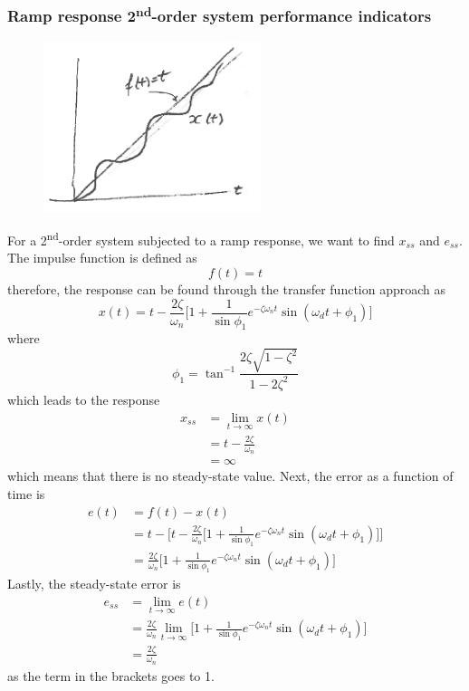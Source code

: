 \documentclass[12pt,letter]{article}
\numberwithin{ex}{section} %
\numberwithin{re}{section} %
\numberwithin{equation}{section}	%
\begin{document}
\subsubsection{Ramp response 2\textsuperscript{nd}-order system performance indicators}

\begin{figure}[H]
	\centering
	\includegraphics[width=2.5in]{../figures/ramp_response_2nd_order_with_steady_state_error}
\end{figure}

For a 2\textsuperscript{nd}-order system subjected to a ramp response, we want to find $x_{ss}$ and $e_{ss}$. The impulse function is defined as
\begin{equation}
f(t) = t
\end{equation}
therefore, the response can be found through the transfer function approach as
\begin{equation}
x(t) = t - \frac{2 \zeta}{\omega_n} \bigg[ 1 + \frac{1}{\sin \phi_1} e^{-\zeta \omega_n t} \sin (\omega_dt + \phi_1) \bigg]
\end{equation}
where
\begin{equation}
\phi_1 = \tan^{-1} \frac{2 \zeta \sqrt{1-\zeta^2}}{1-2 \zeta ^2}
\end{equation}
which leads to the response
\begin{align}
x_{ss} &= \lim\limits_{t \rightarrow \infty} x(t)  \\
&= t - \frac{2 \zeta}{\omega_n} \nonumber \\
&= \infty \nonumber
\end{align}
which means that there is no steady-state value. Next, the error as a function of time is 
\begin{align}
e(t) &= f(t) - x(t) \\
&= t - \Bigg[ t - \frac{2 \zeta}{\omega_n} \bigg[ 1 + \frac{1}{\sin \phi_1} e^{-\zeta \omega_n t} \sin (\omega_dt + \phi_1) \bigg] \Bigg] \nonumber \\
&= \frac{2  \zeta}{\omega_n} \bigg[ 1 + \frac{1}{\sin \phi_1} e^{-\zeta \omega_n t} \sin (\omega_dt + \phi_1) \bigg]  \nonumber 
\end{align}
Lastly, the steady-state error is
\begin{align}
e_{ss} &= \lim\limits_{t \rightarrow \infty}e(t)  \\
&= \frac{2 \zeta}{\omega_n}   \lim\limits_{t \rightarrow \infty} \bigg[ 1 + \frac{1}{\sin \phi_1} e^{-\zeta \omega_n t} \sin (\omega_dt + \phi_1) \bigg]  \nonumber \\
&= \frac{2  \zeta}{\omega_n} \nonumber
\end{align}
as the term in the brackets goes to 1.
\end{document}

